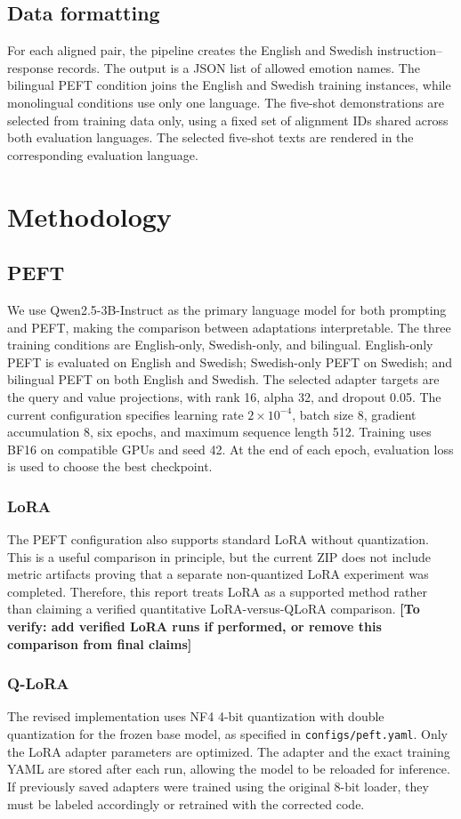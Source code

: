 \documentclass[11pt,a4paper]{article}
\newcommand{\todo}[1]{\textcolor{red!65!black}{\textbf{[To verify: #1]}}}
\begin{document}
\subsection{Data formatting}
For each aligned pair, the pipeline creates the English and Swedish instruction--response records. The output is a JSON list of allowed emotion names. The bilingual PEFT condition joins the English and Swedish training instances, while monolingual conditions use only one language. The five-shot demonstrations are selected from training data only, using a fixed set of alignment IDs shared across both evaluation languages. The selected five-shot texts are rendered in the corresponding evaluation language.

\section{Methodology}
\subsection{PEFT}
We use Qwen2.5-3B-Instruct as the primary language model for both prompting and PEFT, making the comparison between adaptations interpretable. The three training conditions are English-only, Swedish-only, and bilingual. English-only PEFT is evaluated on English and Swedish; Swedish-only PEFT on Swedish; and bilingual PEFT on both English and Swedish. The selected adapter targets are the query and value projections, with rank 16, alpha 32, and dropout 0.05. The current configuration specifies learning rate $2\times 10^{-4}$, batch size 8, gradient accumulation 8, six epochs, and maximum sequence length 512. Training uses BF16 on compatible GPUs and seed 42. At the end of each epoch, evaluation loss is used to choose the best checkpoint.

\subsubsection{LoRA}
The PEFT configuration also supports standard LoRA without quantization. This is a useful comparison in principle, but the current ZIP does not include metric artifacts proving that a separate non-quantized LoRA experiment was completed. Therefore, this report treats LoRA as a supported method rather than claiming a verified quantitative LoRA-versus-QLoRA comparison. \todo{add verified LoRA runs if performed, or remove this comparison from final claims}

\subsubsection{Q-LoRA}
The revised implementation uses NF4 4-bit quantization with double quantization for the frozen base model, as specified in \texttt{configs/peft.yaml}. Only the LoRA adapter parameters are optimized. The adapter and the exact training YAML are stored after each run, allowing the model to be reloaded for inference. If previously saved adapters were trained using the original 8-bit loader, they must be labeled accordingly or retrained with the corrected code.
\end{document}
